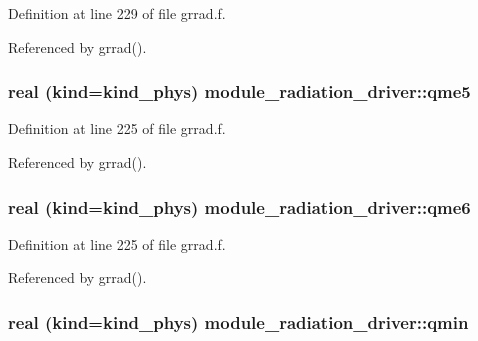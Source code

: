 Definition at line 229 of file grrad.\+f.



Referenced by grrad().

\subsubsection[{\texorpdfstring{qme5}{qme5}}]{\setlength{\rightskip}{0pt plus 5cm}real (kind=kind\+\_\+phys) module\+\_\+radiation\+\_\+driver\+::qme5\hspace{0.3cm}{\ttfamily [private]}}\hypertarget{namespacemodule__radiation__driver_ab671cb80142c71dab5f41f01ccdcc088}{}\label{namespacemodule__radiation__driver_ab671cb80142c71dab5f41f01ccdcc088}


Definition at line 225 of file grrad.\+f.



Referenced by grrad().

\subsubsection[{\texorpdfstring{qme6}{qme6}}]{\setlength{\rightskip}{0pt plus 5cm}real (kind=kind\+\_\+phys) module\+\_\+radiation\+\_\+driver\+::qme6\hspace{0.3cm}{\ttfamily [private]}}\hypertarget{namespacemodule__radiation__driver_a4916e37c472b2f824b6f566ff67200cd}{}\label{namespacemodule__radiation__driver_a4916e37c472b2f824b6f566ff67200cd}


Definition at line 225 of file grrad.\+f.



Referenced by grrad().

\subsubsection[{\texorpdfstring{qmin}{qmin}}]{\setlength{\rightskip}{0pt plus 5cm}real (kind=kind\+\_\+phys) module\+\_\+radiation\+\_\+driver\+::qmin\hspace{0.3cm}{\ttfamily [private]}}\hypertarget{namespacemodule__radiation__driver_afdc2a7e1dbfb075ac33a2388564d9428}{}\label{namespacemodule__radiation__driver_afdc2a7e1dbfb075ac33a2388564d9428}


